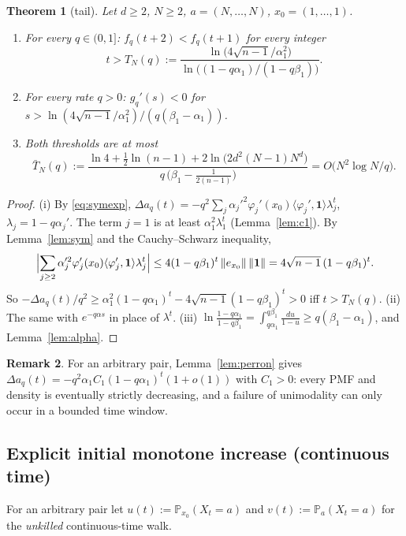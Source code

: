 \documentclass[11pt,a4paper]{article}
\newtheorem{theorem}{Theorem}[section]
\theoremstyle{definition}
\newtheorem{remark}[theorem]{Remark}
\newcommand{\one}{\mathbf 1}
\newcommand{\Prob}{\mathbb P}
\begin{document}
\begin{theorem}[tail]\label{thm:tail}
Let $d\ge2$, $N\ge2$, $a=(N,\dots,N)$, $x_0=(1,\dots,1)$.
\begin{enumerate}
\item[(i)] For every $q\in(0,1]$: $f_q(t+2)<f_q(t+1)$ for every integer
\[
t>T_N(q):=\frac{\ln\bigl(4\sqrt{n-1}/\alpha_1^2\bigr)}{\ln\bigl((1-q\alpha_1)/(1-q\beta_1)\bigr)} .
\]
\item[(ii)] For every rate $q>0$: $g_q'(s)<0$ for $s>\ln(4\sqrt{n-1}/\alpha_1^2)/(q(\beta_1-\alpha_1))$.
\item[(iii)] Both thresholds are at most
\[
\bar T_N(q):=\frac{\ln4+\frac12\ln(n-1)+2\ln\bigl(2d^2(N-1)N^d\bigr)}{q\,\bigl(\beta_1-\frac1{2(n-1)}\bigr)}=O\bigl(N^2\log N/q\bigr).
\]
\end{enumerate}
\end{theorem}
\begin{proof}
(i) By \eqref{eq:symexp}, $\Delta a_q(t)=-q^2\sum_j\alpha_j'^2\varphi_j'(x_0)\langle\varphi_j',\one\rangle\lambda_j^t$, $\lambda_j=1-q\alpha_j'$. The term $j=1$ is at least $\alpha_1^2\lambda_1^t$ (Lemma~\ref{lem:c1}). By Lemma~\ref{lem:sym} and the Cauchy--Schwarz inequality,
\[
\Bigl|\sum_{j\ge2}\alpha_j'^2\varphi_j'(x_0)\langle\varphi_j',\one\rangle\lambda_j^t\Bigr|\le4(1-q\beta_1)^t\,\|e_{x_0}\|\,\|\one\|=4\sqrt{n-1}\,(1-q\beta_1)^t .
\]
So $-\Delta a_q(t)/q^2\ge\alpha_1^2(1-q\alpha_1)^t-4\sqrt{n-1}(1-q\beta_1)^t>0$ iff $t>T_N(q)$. (ii) The same with $e^{-q\alpha s}$ in place of $\lambda^t$. (iii) $\ln\frac{1-q\alpha_1}{1-q\beta_1}=\int_{q\alpha_1}^{q\beta_1}\frac{du}{1-u}\ge q(\beta_1-\alpha_1)$, and Lemma~\ref{lem:alpha}.
\end{proof}

\begin{remark}\label{rem:eventual}
For an arbitrary pair, Lemma~\ref{lem:perron} gives $\Delta a_q(t)=-q^2\alpha_1C_1(1-q\alpha_1)^t(1+o(1))$ with $C_1>0$: every PMF and density is eventually strictly decreasing, and a failure of unimodality can only occur in a bounded time window.
\end{remark}

\subsection{Explicit initial monotone increase (continuous time)}

For an arbitrary pair let $u(t):=\Prob_{x_0}(X_t=a)$ and $v(t):=\Prob_a(X_t=a)$ for the \emph{unkilled} continuous-time walk.
\end{document}
